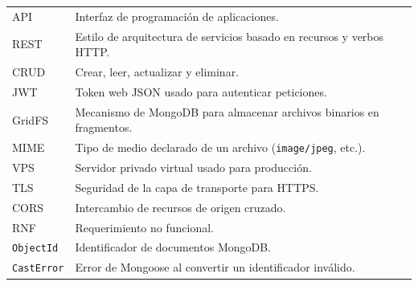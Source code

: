 \begin{center}
\begin{longtable}{p{4.2cm}p{9.3cm}}
  API & Interfaz de programación de aplicaciones. \\
  REST & Estilo de arquitectura de servicios basado en recursos y verbos HTTP. \\
  CRUD & Crear, leer, actualizar y eliminar. \\
  JWT & Token web JSON usado para autenticar peticiones. \\
  GridFS & Mecanismo de MongoDB para almacenar archivos binarios en fragmentos. \\
  MIME & Tipo de medio declarado de un archivo (\texttt{image/jpeg}, etc.). \\
  VPS & Servidor privado virtual usado para producción. \\
  TLS & Seguridad de la capa de transporte para HTTPS. \\
  CORS & Intercambio de recursos de origen cruzado. \\
  RNF & Requerimiento no funcional. \\
  \texttt{ObjectId} & Identificador de documentos MongoDB. \\
  \texttt{CastError} & Error de Mongoose al convertir un identificador inválido. \\
  \bottomrule
\end{longtable}
\end{center}
